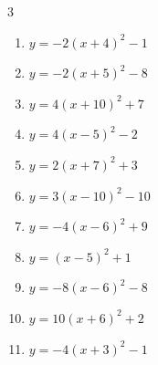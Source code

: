 \begin{multicols}{3}
\begin{enumerate}
        \phantom{$\displaystyle 頂点\left( 5 , -2 \right)$}

  \item $\displaystyle y=-2\left( x+4\right)^{2}-1$

        \phantom{$\displaystyle 頂点\left( -4 , -1 \right)$}

  \item $\displaystyle y=-2\left( x+5\right)^{2}-8$

        \phantom{$\displaystyle 頂点\left( -5 , -8 \right)$}

  \item $\displaystyle y=4\left( x+10\right)^{2}+7$

        \phantom{$\displaystyle 頂点\left( -10 , 7 \right)$}

  \item $\displaystyle y=4\left( x-5\right)^{2}-2$

        \phantom{$\displaystyle 頂点\left( 5 , -2 \right)$}

  \item $\displaystyle y=2\left( x+7\right)^{2}+3$

        \phantom{$\displaystyle 頂点\left( -7 , 3 \right)$}

  \item $\displaystyle y=3\left( x-10\right)^{2}-10$

        \phantom{$\displaystyle 頂点\left( 10 , -10 \right)$}

  \item $\displaystyle y=-4\left( x-6\right)^{2}+9$

        \phantom{$\displaystyle 頂点\left( 6 , 9 \right)$}

  \item $\displaystyle y=\left( x-5\right)^{2}+1$

        \phantom{$\displaystyle 頂点\left( 5 , 1 \right)$}

  \item $\displaystyle y=-8\left( x-6\right)^{2}-8$

        \phantom{$\displaystyle 頂点\left( 6 , -8 \right)$}

  \item $\displaystyle y=10\left( x+6\right)^{2}+2$

        \phantom{$\displaystyle 頂点\left( -6 , 2 \right)$}

  \item $\displaystyle y=-4\left( x+3\right)^{2}-1$

        \phantom{$\displaystyle 頂点\left( -3 , -1 \right)$}


\end{enumerate}
\end{multicols}
